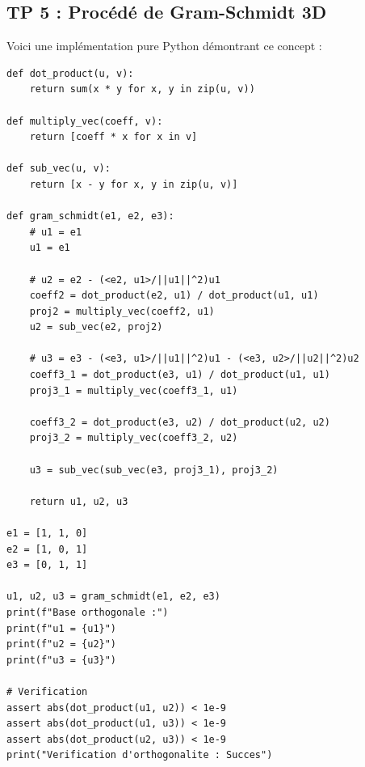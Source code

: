 \documentclass[11pt,a4paper]{article}
\begin{document}
\subsection*{TP 5 : Procédé de Gram-Schmidt 3D}
Voici une implémentation pure Python démontrant ce concept :
\begin{lstlisting}
def dot_product(u, v):
    return sum(x * y for x, y in zip(u, v))

def multiply_vec(coeff, v):
    return [coeff * x for x in v]

def sub_vec(u, v):
    return [x - y for x, y in zip(u, v)]

def gram_schmidt(e1, e2, e3):
    # u1 = e1
    u1 = e1

    # u2 = e2 - (<e2, u1>/||u1||^2)u1
    coeff2 = dot_product(e2, u1) / dot_product(u1, u1)
    proj2 = multiply_vec(coeff2, u1)
    u2 = sub_vec(e2, proj2)

    # u3 = e3 - (<e3, u1>/||u1||^2)u1 - (<e3, u2>/||u2||^2)u2
    coeff3_1 = dot_product(e3, u1) / dot_product(u1, u1)
    proj3_1 = multiply_vec(coeff3_1, u1)

    coeff3_2 = dot_product(e3, u2) / dot_product(u2, u2)
    proj3_2 = multiply_vec(coeff3_2, u2)

    u3 = sub_vec(sub_vec(e3, proj3_1), proj3_2)

    return u1, u2, u3

e1 = [1, 1, 0]
e2 = [1, 0, 1]
e3 = [0, 1, 1]

u1, u2, u3 = gram_schmidt(e1, e2, e3)
print(f"Base orthogonale :")
print(f"u1 = {u1}")
print(f"u2 = {u2}")
print(f"u3 = {u3}")

# Verification
assert abs(dot_product(u1, u2)) < 1e-9
assert abs(dot_product(u1, u3)) < 1e-9
assert abs(dot_product(u2, u3)) < 1e-9
print("Verification d'orthogonalite : Succes")
\end{lstlisting}
\end{document}
